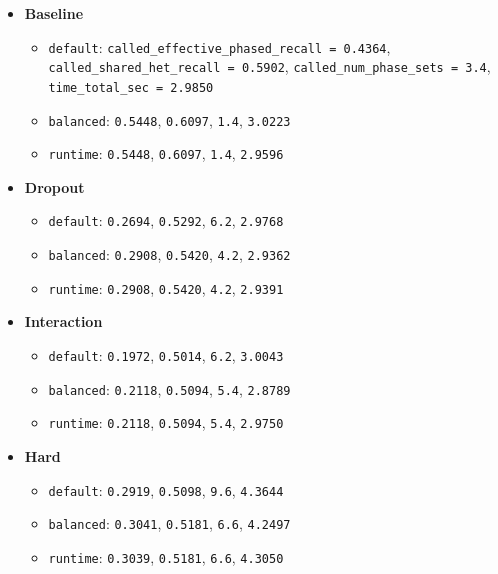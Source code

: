 \documentclass[
]{article}
\providecommand{\tightlist}{%
  \setlength{\itemsep}{0pt}\setlength{\parskip}{0pt}}
\begin{document}
\begin{itemize}
\tightlist
\item
  \textbf{Baseline}

  \begin{itemize}
  \tightlist
  \item
    \texttt{default}:
    \texttt{called\_effective\_phased\_recall\ =\ 0.4364},
    \texttt{called\_shared\_het\_recall\ =\ 0.5902},
    \texttt{called\_num\_phase\_sets\ =\ 3.4},
    \texttt{time\_total\_sec\ =\ 2.9850}
  \item
    \texttt{balanced}: \texttt{0.5448}, \texttt{0.6097}, \texttt{1.4},
    \texttt{3.0223}
  \item
    \texttt{runtime}: \texttt{0.5448}, \texttt{0.6097}, \texttt{1.4},
    \texttt{2.9596}
  \end{itemize}
\item
  \textbf{Dropout}

  \begin{itemize}
  \tightlist
  \item
    \texttt{default}: \texttt{0.2694}, \texttt{0.5292}, \texttt{6.2},
    \texttt{2.9768}
  \item
    \texttt{balanced}: \texttt{0.2908}, \texttt{0.5420}, \texttt{4.2},
    \texttt{2.9362}
  \item
    \texttt{runtime}: \texttt{0.2908}, \texttt{0.5420}, \texttt{4.2},
    \texttt{2.9391}
  \end{itemize}
\item
  \textbf{Interaction}

  \begin{itemize}
  \tightlist
  \item
    \texttt{default}: \texttt{0.1972}, \texttt{0.5014}, \texttt{6.2},
    \texttt{3.0043}
  \item
    \texttt{balanced}: \texttt{0.2118}, \texttt{0.5094}, \texttt{5.4},
    \texttt{2.8789}
  \item
    \texttt{runtime}: \texttt{0.2118}, \texttt{0.5094}, \texttt{5.4},
    \texttt{2.9750}
  \end{itemize}
\item
  \textbf{Hard}

  \begin{itemize}
  \tightlist
  \item
    \texttt{default}: \texttt{0.2919}, \texttt{0.5098}, \texttt{9.6},
    \texttt{4.3644}
  \item
    \texttt{balanced}: \texttt{0.3041}, \texttt{0.5181}, \texttt{6.6},
    \texttt{4.2497}
  \item
    \texttt{runtime}: \texttt{0.3039}, \texttt{0.5181}, \texttt{6.6},
    \texttt{4.3050}
  \end{itemize}
\end{itemize}
\end{document}
